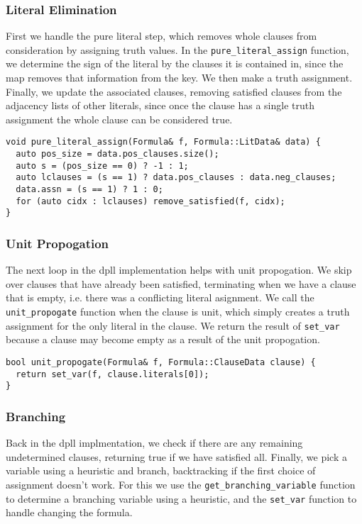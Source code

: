 \documentclass[10pt,AMS Euler]{article}
\begin{document}
\subsubsection{Literal Elimination}
\label{sec:orgdfe9566}
First we handle the pure literal step, which removes whole clauses from
consideration by assigning truth values. In the \texttt{pure\_literal\_assign}
function, we determine the sign of the literal by the clauses it is
contained in, since the map removes that information from the key.
We then make a truth assignment. Finally, we update the associated clauses,
removing satisfied clauses from the adjacency lists of other literals,
since once the clause has a single truth assignment the whole clause can
be considered true.
\begin{verbatim}
void pure_literal_assign(Formula& f, Formula::LitData& data) {
  auto pos_size = data.pos_clauses.size();
  auto s = (pos_size == 0) ? -1 : 1;
  auto lclauses = (s == 1) ? data.pos_clauses : data.neg_clauses;
  data.assn = (s == 1) ? 1 : 0;
  for (auto cidx : lclauses) remove_satisfied(f, cidx);
}
\end{verbatim}

\subsubsection{Unit Propogation}
\label{sec:org3ebaaef}
The next loop in the dpll implementation helps with unit propogation.
We skip over clauses that have already been satisfied, terminating when we
have a clause that is empty, i.e. there was a conflicting literal asignment.
We call the \texttt{unit\_propogate} function when the clause is unit, which
simply creates a truth assignment for the only literal in the clause.
We return the result of \texttt{set\_var} because a clause may become empty as a result
of the unit propogation.
\begin{verbatim}
bool unit_propogate(Formula& f, Formula::ClauseData clause) {
  return set_var(f, clause.literals[0]);
}
\end{verbatim}

\subsubsection{Branching}
\label{sec:org70cd821}
Back in the dpll implmentation, we check if there are any remaining undetermined
clauses, returning true if we have satisfied all. Finally, we pick a
variable using a heuristic and branch, backtracking if the first choice of
assignment doesn't work. For this we use the \texttt{get\_branching\_variable} function
to determine a branching variable using a heuristic, and the \texttt{set\_var}
function to handle changing the formula.
\end{document}
